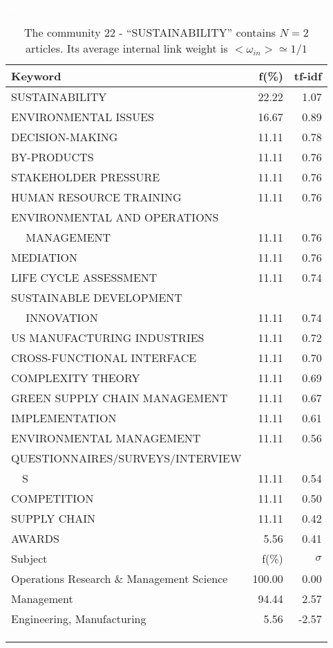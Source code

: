 \documentclass[a4paper,11pt]{report}
\begin{document}
\begin{landscape}
\begin{table}[!ht]
\caption{The community 22 - ``SUSTAINABILITY'' contains $N = 2$ articles. Its average internal link weight is $<\omega_{in}> \simeq 1/1$ }
\textcolor{white}{aa}\\
{\scriptsize\begin{tabular}{|l r  r|}
\hline
Keyword & f(\%) & tf-idf \\
\hline
SUSTAINABILITY & 22.22 & 1.07\\
ENVIRONMENTAL ISSUES & 16.67 & 0.89\\
DECISION-MAKING & 11.11 & 0.78\\
BY-PRODUCTS & 11.11 & 0.76\\
STAKEHOLDER PRESSURE & 11.11 & 0.76\\
HUMAN RESOURCE TRAINING & 11.11 & 0.76\\
ENVIRONMENTAL AND OPERATIONS &  &\\
$\quad$ MANAGEMENT & 11.11 & 0.76\\
MEDIATION & 11.11 & 0.76\\
LIFE CYCLE ASSESSMENT & 11.11 & 0.74\\
SUSTAINABLE DEVELOPMENT &  &\\
$\quad$ INNOVATION & 11.11 & 0.74\\
US MANUFACTURING INDUSTRIES & 11.11 & 0.72\\
CROSS-FUNCTIONAL INTERFACE & 11.11 & 0.70\\
COMPLEXITY THEORY & 11.11 & 0.69\\
GREEN SUPPLY CHAIN MANAGEMENT & 11.11 & 0.67\\
IMPLEMENTATION & 11.11 & 0.61\\
ENVIRONMENTAL MANAGEMENT & 11.11 & 0.56\\
QUESTIONNAIRES/SURVEYS/INTERVIEW &  &\\
$\quad$S & 11.11 & 0.54\\
COMPETITION & 11.11 & 0.50\\
SUPPLY CHAIN & 11.11 & 0.42\\
AWARDS & 5.56 & 0.41\\
\hline
\hline
Subject & f(\%) & $\sigma$\\
\hline
Operations Research \& Management Science & 100.00 & 0.00\\
Management & 94.44 & 2.57\\
Engineering, Manufacturing & 5.56 & -2.57\\
 &  & \\
 &  & \\
 &  & \\

\end{tabular}}
\end{table}
\end{landscape}
\end{document}

